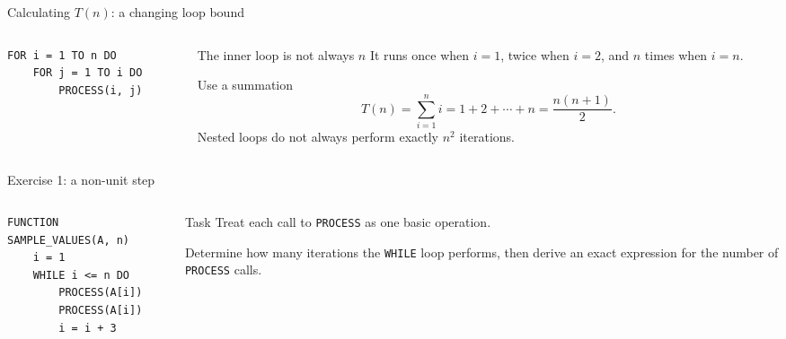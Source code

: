 \documentclass[aspectratio=169]{beamer}
\begin{document}
\begin{frame}[fragile]{Calculating $T(n)$: a changing loop bound}
  \begin{columns}[T]
    \begin{column}{0.48\textwidth}
\begin{lstlisting}[style=pseudo]
FOR i = 1 TO n DO
    FOR j = 1 TO i DO
        PROCESS(i, j)
\end{lstlisting}
    \end{column}
    \begin{column}{0.48\textwidth}
      \begin{block}{The inner loop is not always $n$}
        It runs once when $i=1$, twice when $i=2$, and $n$ times when $i=n$.
      \end{block}
      \begin{alertblock}{Use a summation}
        \[
          T(n)=\sum_{i=1}^{n}i
              =1+2+\cdots+n
              =\frac{n(n+1)}{2}.
        \]
        Nested loops do not always perform exactly $n^2$ iterations.
      \end{alertblock}
    \end{column}
  \end{columns}
\end{frame}

\begin{frame}[fragile]{Exercise 1: a non-unit step}
  \begin{columns}[T]
    \begin{column}{0.55\textwidth}
\begin{lstlisting}[style=pseudo,basicstyle=\ttfamily\small]
FUNCTION SAMPLE_VALUES(A, n)
    i = 1
    WHILE i <= n DO
        PROCESS(A[i])
        PROCESS(A[i])
        i = i + 3
\end{lstlisting}
    \end{column}
    \begin{column}{0.41\textwidth}
      \begin{block}{Task}
        Treat each call to \texttt{PROCESS} as one basic operation.

        Determine how many iterations the \texttt{WHILE} loop performs, then
        derive an exact expression for the number of \texttt{PROCESS} calls.
      \end{block}
    \end{column}
  \end{columns}
\end{frame}
\end{document}
